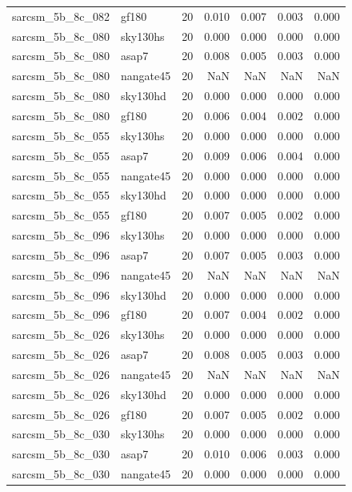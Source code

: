 \begin{tabular}{llrrrrr}
sarcsm\_5b\_8c\_082 & gf180 & 20 & 0.010 & 0.007 & 0.003 & 0.000 \\
sarcsm\_5b\_8c\_080 & sky130hs & 20 & 0.000 & 0.000 & 0.000 & 0.000 \\
sarcsm\_5b\_8c\_080 & asap7 & 20 & 0.008 & 0.005 & 0.003 & 0.000 \\
sarcsm\_5b\_8c\_080 & nangate45 & 20 & NaN & NaN & NaN & NaN \\
sarcsm\_5b\_8c\_080 & sky130hd & 20 & 0.000 & 0.000 & 0.000 & 0.000 \\
sarcsm\_5b\_8c\_080 & gf180 & 20 & 0.006 & 0.004 & 0.002 & 0.000 \\
sarcsm\_5b\_8c\_055 & sky130hs & 20 & 0.000 & 0.000 & 0.000 & 0.000 \\
sarcsm\_5b\_8c\_055 & asap7 & 20 & 0.009 & 0.006 & 0.004 & 0.000 \\
sarcsm\_5b\_8c\_055 & nangate45 & 20 & 0.000 & 0.000 & 0.000 & 0.000 \\
sarcsm\_5b\_8c\_055 & sky130hd & 20 & 0.000 & 0.000 & 0.000 & 0.000 \\
sarcsm\_5b\_8c\_055 & gf180 & 20 & 0.007 & 0.005 & 0.002 & 0.000 \\
sarcsm\_5b\_8c\_096 & sky130hs & 20 & 0.000 & 0.000 & 0.000 & 0.000 \\
sarcsm\_5b\_8c\_096 & asap7 & 20 & 0.007 & 0.005 & 0.003 & 0.000 \\
sarcsm\_5b\_8c\_096 & nangate45 & 20 & NaN & NaN & NaN & NaN \\
sarcsm\_5b\_8c\_096 & sky130hd & 20 & 0.000 & 0.000 & 0.000 & 0.000 \\
sarcsm\_5b\_8c\_096 & gf180 & 20 & 0.007 & 0.004 & 0.002 & 0.000 \\
sarcsm\_5b\_8c\_026 & sky130hs & 20 & 0.000 & 0.000 & 0.000 & 0.000 \\
sarcsm\_5b\_8c\_026 & asap7 & 20 & 0.008 & 0.005 & 0.003 & 0.000 \\
sarcsm\_5b\_8c\_026 & nangate45 & 20 & NaN & NaN & NaN & NaN \\
sarcsm\_5b\_8c\_026 & sky130hd & 20 & 0.000 & 0.000 & 0.000 & 0.000 \\
sarcsm\_5b\_8c\_026 & gf180 & 20 & 0.007 & 0.005 & 0.002 & 0.000 \\
sarcsm\_5b\_8c\_030 & sky130hs & 20 & 0.000 & 0.000 & 0.000 & 0.000 \\
sarcsm\_5b\_8c\_030 & asap7 & 20 & 0.010 & 0.006 & 0.003 & 0.000 \\
sarcsm\_5b\_8c\_030 & nangate45 & 20 & 0.000 & 0.000 & 0.000 & 0.000 \\

\end{tabular}
